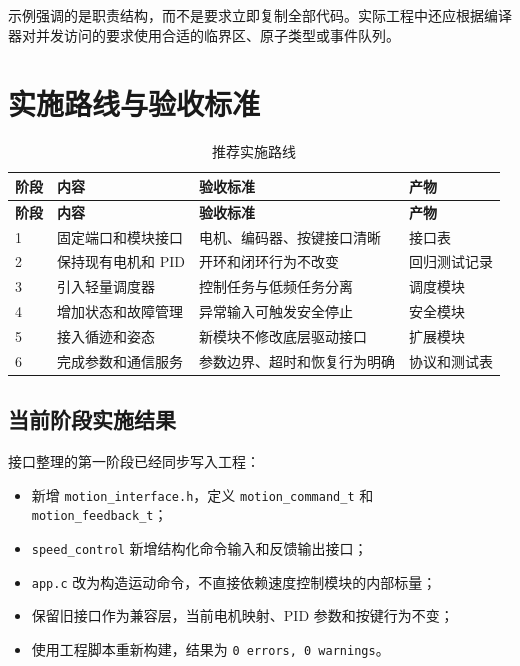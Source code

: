 \documentclass[11pt,a4paper,fontset=fandol]{ctexart}
\begin{document}
示例强调的是职责结构，而不是要求立即复制全部代码。实际工程中还应根据编译器对并发访问的要求使用合适的临界区、原子类型或事件队列。

\section{实施路线与验收标准}

\begin{longtable}{p{}p{}p{}p{}}
\caption{推荐实施路线}\\
\toprule
\textbf{阶段} & \textbf{内容} & \textbf{验收标准} & \textbf{产物}\\
\midrule
\endfirsthead
\toprule
\textbf{阶段} & \textbf{内容} & \textbf{验收标准} & \textbf{产物}\\
\midrule
\endhead
1 & 固定端口和模块接口 & 电机、编码器、按键接口清晰 & 接口表\\
2 & 保持现有电机和 PID & 开环和闭环行为不改变 & 回归测试记录\\
3 & 引入轻量调度器 & 控制任务与低频任务分离 & 调度模块\\
4 & 增加状态和故障管理 & 异常输入可触发安全停止 & 安全模块\\
5 & 接入循迹和姿态 & 新模块不修改底层驱动接口 & 扩展模块\\
6 & 完成参数和通信服务 & 参数边界、超时和恢复行为明确 & 协议和测试表\\
\bottomrule
\end{longtable}

\subsection{当前阶段实施结果}

接口整理的第一阶段已经同步写入工程：

\begin{itemize}
\item 新增 \texttt{motion\_interface.h}，定义
\texttt{motion\_command\_t} 和 \texttt{motion\_feedback\_t}；
\item \texttt{speed\_control} 新增结构化命令输入和反馈输出接口；
\item \texttt{app.c} 改为构造运动命令，不直接依赖速度控制模块的内部标量；
\item 保留旧接口作为兼容层，当前电机映射、PID 参数和按键行为不变；
\item 使用工程脚本重新构建，结果为 \texttt{0 errors, 0 warnings}。
\end{itemize}
\end{document}
